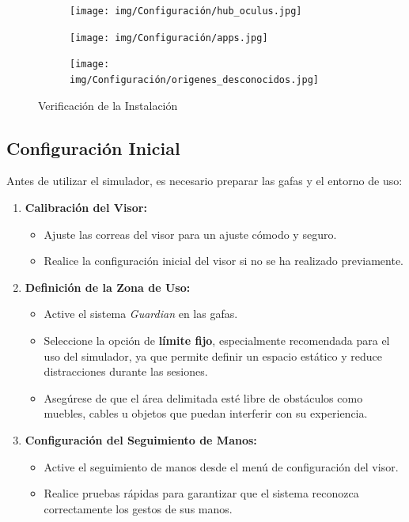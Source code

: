 \begin{enumerate}
\begin{itemize}
    \end{itemize}
    \begin{figure}[thbp]
            \centering
            \begin{subfigure}[b]{0.45\linewidth}
                \texttt{[image: img/Configuración/hub\_oculus.jpg]}
            \end{subfigure}
            \begin{subfigure}[b]{0.45\linewidth}
                \texttt{[image: img/Configuración/apps.jpg]}
            \end{subfigure}
            \begin{subfigure}[b]{0.6\linewidth}
                \texttt{[image: img/Configuración/origenes\_desconocidos.jpg]}
            \end{subfigure}
            \caption{Verificación de la Instalación}
        \end{figure}
\end{enumerate}

\subsection{Configuración Inicial}

Antes de utilizar el simulador, es necesario preparar las gafas y el entorno de uso:

\begin{enumerate}
    \item \textbf{Calibración del Visor:}
    \begin{itemize}
        \item Ajuste las correas del visor para un ajuste cómodo y seguro.
        \item Realice la configuración inicial del visor si no se ha realizado previamente.
    \end{itemize}
    \item \textbf{Definición de la Zona de Uso:}
    \begin{itemize}
        \item Active el sistema \textit{Guardian} en las gafas.
        \item Seleccione la opción de \textbf{límite fijo}, especialmente recomendada para el uso del simulador, ya que permite definir un espacio estático y reduce distracciones durante las sesiones.
        \item Asegúrese de que el área delimitada esté libre de obstáculos como muebles, cables u objetos que puedan interferir con su experiencia.
    \end{itemize}
    \item \textbf{Configuración del Seguimiento de Manos:}
    \begin{itemize}
        \item Active el seguimiento de manos desde el menú de configuración del visor.
        \item Realice pruebas rápidas para garantizar que el sistema reconozca correctamente los gestos de sus manos.
    \end{itemize}
\end{enumerate}
\newpage

